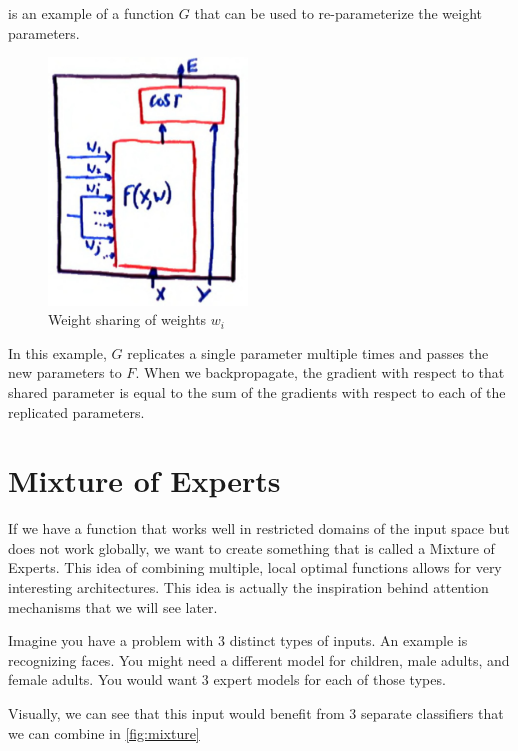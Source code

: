  is an example of a function $G$ that can be used to re-parameterize the weight parameters.

\begin{figure}
    \centering
    \includegraphics[width=150pt]{figs/weight_sharing.png}
    \caption{Weight sharing of weights $w_{i}$}
    \label{fig:sharing}
\end{figure}

In this example, $G$ replicates a single parameter multiple times and passes the new parameters to $F$. 
When we backpropagate, the gradient with respect to that shared parameter is equal to the sum of the gradients with respect to each of the replicated parameters.

\section{Mixture of Experts}

If we have a function that works well in restricted domains of the input space but does not work globally, we want to create something that is called a Mixture of Experts. 
This idea of combining multiple, local optimal functions allows for very interesting architectures. 
This idea is actually the inspiration behind attention mechanisms that we will see later. 

Imagine you have a problem with 3 distinct types of inputs. 
An example is recognizing faces. 
You might need a different model for children, male adults, and female adults. 
You would want 3 expert models for each of those types.

Visually, we can see that this input would benefit from 3 separate classifiers that we can combine in \cref{fig:mixture}

